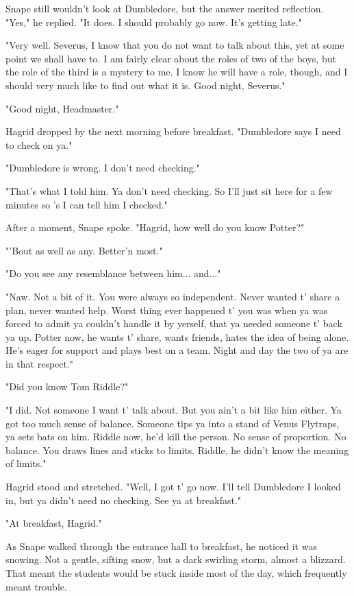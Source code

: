 \documentclass[a4paper,11pt]{article}
\begin{document}
Snape still wouldn't look at Dumbledore, but the answer merited reflection. "Yes," he replied. "It does. I should probably go now. It's getting late."

"Very well. Severus, I know that you do not want to talk about this, yet at some point we shall have to. I am fairly clear about the roles of two of the boys, but the role of the third is a mystery to me. I know he will have a role, though, and I should very much like to find out what it is. Good night, Severus."

"Good night, Headmaster."

Hagrid dropped by the next morning before breakfast. "Dumbledore says I need to check on ya."

"Dumbledore is wrong. I don't need checking."

"That's what I told him. Ya don't need checking. So I'll just sit here for a few minutes so 's I can tell him I checked."

After a moment, Snape spoke. "Hagrid, how well do you know Potter?"

"'Bout as well as any. Better'n most."

"Do you see any resemblance between him... and..."

"Naw. Not a bit of it. You were always so independent. Never wanted t' share a plan, never wanted help. Worst thing ever happened t' you was when ya was forced to admit ya couldn't handle it by yerself, that ya needed someone t' back ya up. Potter now, he wants t' share, wants friends, hates the idea of being alone. He's eager for support and plays best on a team. Night and day the two of ya are in that respect."

"Did you know Tom Riddle?"

"I did. Not someone I want t' talk about. But you ain't a bit like him either. Ya got too much sense of balance. Someone tips ya into a stand of Venus Flytraps, ya sets bats on him. Riddle now, he'd kill the person. No sense of proportion. No balance. You draws lines and sticks to limits. Riddle, he didn't know the meaning of limits."

Hagrid stood and stretched. "Well, I got t' go now. I'll tell Dumbledore I looked in, but ya didn't need no checking. See ya at breakfast."

"At breakfast, Hagrid."

As Snape walked through the entrance hall to breakfast, he noticed it was snowing. Not a gentle, sifting snow, but a dark swirling storm, almost a blizzard. That meant the students would be stuck inside most of the day, which frequently meant trouble.
\end{document}
